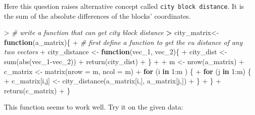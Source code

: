 \documentclass[
]{article}
\newenvironment{Shaded}{\begin{snugshade}}{\end{snugshade}}
\newcommand{\AttributeTok}[1]{\textcolor[rgb]{0.77,0.63,0.00}{#1}}
\newcommand{\CommentTok}[1]{\textcolor[rgb]{0.56,0.35,0.01}{\textit{#1}}}
\newcommand{\ControlFlowTok}[1]{\textcolor[rgb]{0.13,0.29,0.53}{\textbf{#1}}}
\newcommand{\DecValTok}[1]{\textcolor[rgb]{0.00,0.00,0.81}{#1}}
\newcommand{\ErrorTok}[1]{\textcolor[rgb]{0.64,0.00,0.00}{\textbf{#1}}}
\newcommand{\FunctionTok}[1]{\textcolor[rgb]{0.00,0.00,0.00}{#1}}
\newcommand{\NormalTok}[1]{#1}
\newcommand{\OtherTok}[1]{\textcolor[rgb]{0.56,0.35,0.01}{#1}}
\newcommand{\SpecialCharTok}[1]{\textcolor[rgb]{0.00,0.00,0.00}{#1}}
\begin{document}
Here this question raises alternative concept called
\texttt{city\ block\ distance}. It is the sum of the absolute
differences of the blocks' coordinates.

\begin{Shaded}
\begin{Highlighting}[]
\SpecialCharTok{\textgreater{}} \CommentTok{\# write a function that can get city block distance}
\ErrorTok{\textgreater{}}\NormalTok{ city\_matrix}\OtherTok{\textless{}{-}}\ControlFlowTok{function}\NormalTok{(a\_matrix)\{}
\SpecialCharTok{+}   \CommentTok{\# first define a function to get the eu distance of any two vectors}
\SpecialCharTok{+}\NormalTok{   city\_distance }\OtherTok{\textless{}{-}} \ControlFlowTok{function}\NormalTok{(vec\_1, vec\_2)\{}
\SpecialCharTok{+}\NormalTok{     city\_dist }\OtherTok{\textless{}{-}} \FunctionTok{sum}\NormalTok{(}\FunctionTok{abs}\NormalTok{(vec\_1}\SpecialCharTok{{-}}\NormalTok{vec\_2))}
\SpecialCharTok{+}     \FunctionTok{return}\NormalTok{(city\_dist)}
\SpecialCharTok{+}\NormalTok{     \}}
\SpecialCharTok{+}   
\SpecialCharTok{+}\NormalTok{   m }\OtherTok{\textless{}{-}} \FunctionTok{nrow}\NormalTok{(a\_matrix)}
\SpecialCharTok{+}\NormalTok{   c\_matrix }\OtherTok{\textless{}{-}} \FunctionTok{matrix}\NormalTok{(}\AttributeTok{nrow =}\NormalTok{ m, }\AttributeTok{ncol =}\NormalTok{ m)}
\SpecialCharTok{+}   \ControlFlowTok{for}\NormalTok{ (i }\ControlFlowTok{in} \DecValTok{1}\SpecialCharTok{:}\NormalTok{m ) \{}
\SpecialCharTok{+}     \ControlFlowTok{for}\NormalTok{ (j }\ControlFlowTok{in} \DecValTok{1}\SpecialCharTok{:}\NormalTok{m) \{}
\SpecialCharTok{+}\NormalTok{       c\_matrix[i,j] }\OtherTok{\textless{}{-}} \FunctionTok{city\_distance}\NormalTok{(a\_matrix[i,], a\_matrix[j,])}
\SpecialCharTok{+}\NormalTok{     \}}
\SpecialCharTok{+}\NormalTok{   \}}
\SpecialCharTok{+}   \FunctionTok{return}\NormalTok{(c\_matrix)}
\SpecialCharTok{+}\NormalTok{ \}}
\end{Highlighting}
\end{Shaded}

This function seems to work well. Try it on the given data:
\end{document}
